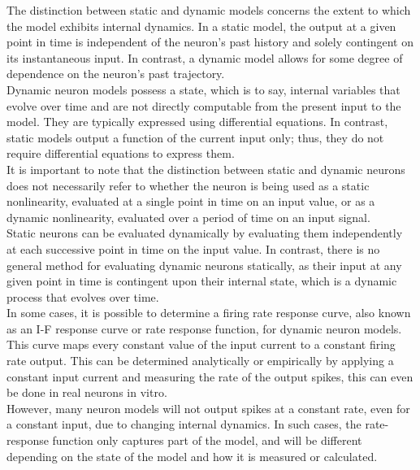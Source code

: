 \noindent The distinction between static and dynamic models concerns the extent to which the model exhibits internal dynamics. In a static model, the output at a given point in time is independent of the neuron's past history and solely contingent on its instantaneous input. In contrast, a dynamic model allows for some degree of dependence on the neuron's past trajectory.\\

\noindent Dynamic neuron models possess a state, which is to say, internal variables that evolve over time and are not directly computable from the present input to the model. They are typically expressed using differential equations. In contrast, static models output a function of the current input only; thus, they do not require differential equations to express them. \\

\noindent It is important to note that the distinction between static and dynamic neurons does not necessarily refer to whether the neuron is being used as a static nonlinearity, evaluated at a single point in time on an input value, or as a dynamic nonlinearity, evaluated over a period of time on an input signal. \\

\noindent Static neurons can be evaluated dynamically by evaluating them independently at each successive point in time on the input value. In contrast, there is no general method for evaluating dynamic neurons statically, as their input at any given point in time is contingent upon their internal state, which is a dynamic process that evolves over time. \\

\noindent In some cases, it is possible to determine a firing rate response curve, also known as an I-F response curve or rate response function, for dynamic neuron models. This curve maps every constant value of the input current to a constant firing rate output. This can be determined analytically or empirically by applying a constant input current and measuring the rate of the output spikes, this can even be done in real neurons in vitro. \\

\noindent However, many neuron models will not output spikes at a constant rate, even for a constant input, due to changing internal dynamics. In such cases, the rate-response function only captures part of the model, and will be different depending on the state of the model and how it is measured or calculated. \\

